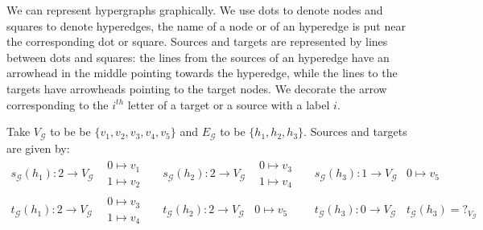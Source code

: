 \documentclass[a4paper,UKenglish,cleveref,pdftex,thm-restate,numberwithinsect]{lipics-v2021}
\begin{document}
We can represent hypergraphs graphically. We use dots to denote nodes and squares to denote hyperedges, the name of a node or of an hyperedge is put near the corresponding dot or square. Sources and targets are represented by lines between dots and squares: the lines from the sources of an hyperedge have an arrowhead in the middle pointing towards the hyperedge, while the lines to the targets have arrowheads pointing to the target nodes.  We  decorate the arrow corresponding to the $i^{th}$ letter of a target or a source with a label $i$.
\iffalse 
\begin{example}Take $V_{\mathcal{G}}$ to be be $\{v_1, v_2, v_3, v_4, v_5\}$ and $E_{\mathcal{G}}$ to be $\{h_1, h_2, h_3\}$. Sources and targets are given by:
	\[\begin{matrix}
		s_{\mathcal{G}}(h_1)\colon 2\to V_{\mathcal{G}}  & \begin{matrix}
			0 \mapsto v_1\\
			1\mapsto v_2
		\end{matrix} && s_{\mathcal{G}}(h_2)\colon 2\to V_{\mathcal{G}} & \begin{matrix}
			0 \mapsto v_3\\
			1\mapsto v_4 
		\end{matrix} && s_{\mathcal{G}}(h_3)\colon 1\to V_{\mathcal{G}} & 
		0 \mapsto v_5\\
		t_{\mathcal{G}}(h_1)\colon 2\to V_{\mathcal{G}} & \begin{matrix}
			0 \mapsto v_3\\
			1\mapsto v_4
		\end{matrix} && t_{\mathcal{G}}(h_2)\colon 2\to V_{\mathcal{G}} & 0\mapsto v_5 && t_{\mathcal{G}}(h_3)\colon 0\to V_{\mathcal{G}} &  t_{\mathcal{G}}(h_3)=?_{ V_{\mathcal{G}}} 
	\end{matrix}\]
	

\end{example}
\end{document}
